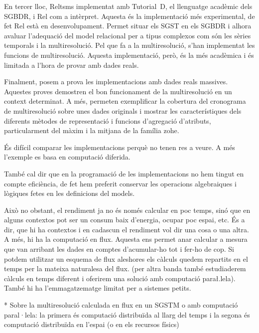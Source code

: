 En tercer lloc, Reltsms implementat amb Tutorial~D, el llenguatge
acadèmic dels \gls{SGBDR}, i Rel com a intèrpret.  Aquesta és la
implementació més experimental, de fet Rel està en desenvolupament.
Permet situar els \gls{SGST} en els \gls{SGBDR} i alhora avaluar
l'adequació del model relacional per a tipus complexos com són les
sèries temporals i la multiresolució.  Pel que fa a la multiresolució,
s'han implementat les funcions de multiresolució. Aquesta
implementació, però, és la més acadèmica i és limitada a l'hora de
provar amb dades reals.



Finalment, posem a prova les implementacions amb dades reals massives.
Aquestes proves demostren el bon funcionament de la multiresolució en
un context determinat. A més, permeten exemplificar la cobertura del
cronograma de multiresolució sobre unes dades originals i mostrar les
característiques dels diferents mètodes de representació i funcions
d'agregació d'atributs, particularment del màxim i la mitjana de la
família \gls{zohe}.







És difícil comparar les implementacions perquè no tenen res a veure. A més l'exemple es basa en computació diferida. 

També cal dir que en la programació de les implementacions no hem tingut en compte eficiència, de fet hem preferit conservar les operacions algebraiques i lògiques fetes en les definicions del models.

Això no obstant, el rendiment ja no és només calcular en poc temps, sinó que en alguns contextos pot ser un consum baix d'energia, ocupar poc espai, etc.
És a dir, que hi ha contextos i en cadascun el rendiment vol dir una cosa o una altra.
A més, hi ha la computació en flux. Aquesta ens permet anar calcular a mesura que van arribant les dades en comptes d'acumular-ho tot i fer-ho de cop. Si potdem utilitzar un esquema de flux aleshores els càlculs quedem repartits en el temps per la mateixa naturalesa del flux. (per altra banda també estudiaderem càlculs en temps diferent i oferirem una solució amb computació para\l.lela).
També hi ha l'emmagatzematge limitat per a sistemes petits.



* Sobre la multiresolució calculada en flux en un SGSTM o amb computació paral·lela: la primera és computació distribuïda al llarg del temps i la segona és computació distribuïda en l'espai (o en els recursos físics)



